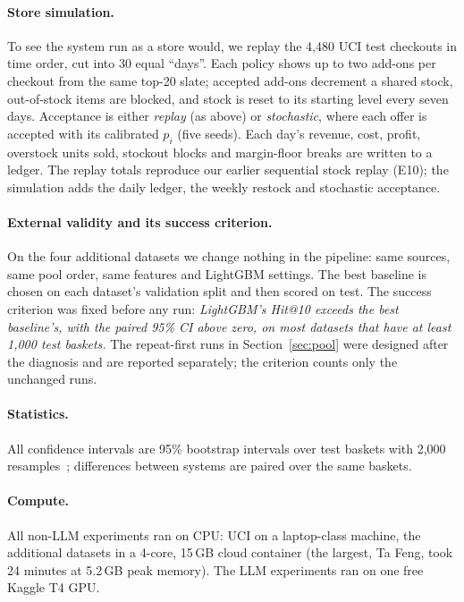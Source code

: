 \documentclass[11pt]{article}
\begin{document}
\paragraph{Store simulation.}
To see the system run as a store would, we replay the 4,480 UCI test checkouts in time order, cut into 30 equal ``days''.
Each policy shows up to two add-ons per checkout from the same top-20 slate; accepted add-ons decrement a shared stock, out-of-stock items are blocked, and stock is reset to its starting level every seven days.
Acceptance is either \emph{replay} (as above) or \emph{stochastic}, where each offer is accepted with its calibrated $p_i$ (five seeds).
Each day's revenue, cost, profit, overstock units sold, stockout blocks and margin-floor breaks are written to a ledger.
The replay totals reproduce our earlier sequential stock replay (E10); the simulation adds the daily ledger, the weekly restock and stochastic acceptance.

\paragraph{External validity and its success criterion.}
On the four additional datasets we change nothing in the pipeline: same sources, same pool order, same features and LightGBM settings.
The best baseline is chosen on each dataset's validation split and then scored on test.
The success criterion was fixed before any run: \emph{LightGBM's Hit@10 exceeds the best baseline's, with the paired 95\% CI above zero, on most datasets that have at least 1,000 test baskets.}
The repeat-first runs in Section~\ref{sec:pool} were designed after the diagnosis and are reported separately; the criterion counts only the unchanged runs.

\paragraph{Statistics.}
All confidence intervals are 95\% bootstrap intervals over test baskets with 2,000 resamples~\citep{efron1993bootstrap}; differences between systems are paired over the same baskets.

\paragraph{Compute.}
All non-LLM experiments ran on CPU: UCI on a laptop-class machine, the additional datasets in a 4-core, 15\,GB cloud container (the largest, Ta Feng, took 24 minutes at 5.2\,GB peak memory).
The LLM experiments ran on one free Kaggle T4 GPU.
\end{document}
